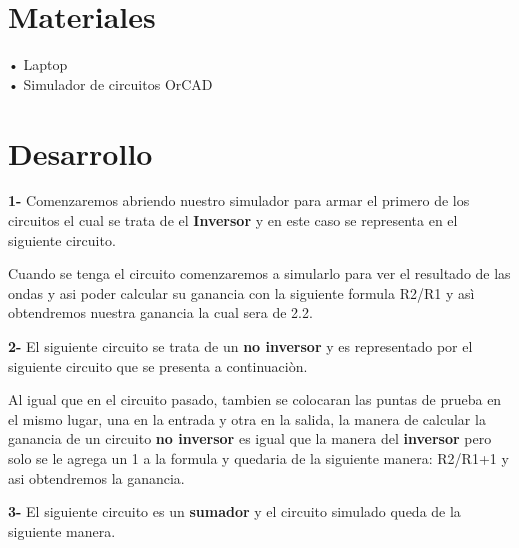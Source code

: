 \documentclass[12pt,a4paper]{article}
\begin{document}
\section{Materiales}
• Laptop\\• Simulador de circuitos OrCAD

\section{Desarrollo}
\textbf{1-} Comenzaremos abriendo nuestro simulador para armar el primero de los circuitos el cual se trata de el \textbf{Inversor} y en este caso se representa en el siguiente circuito.

\begin{figure}
\centering

\end{figure}

Cuando se tenga el circuito comenzaremos a simularlo para ver el resultado de las ondas y asi poder calcular su ganancia con la siguiente formula R2/R1 y asì obtendremos nuestra ganancia la cual sera de 2.2.

\begin{figure}
\centering

\end{figure}

\textbf{2-} El siguiente circuito se trata de un \textbf{no inversor} y es representado por el siguiente circuito que se presenta a continuaciòn.

\begin{figure}
\centering

\end{figure}

Al igual que en el circuito pasado, tambien se colocaran las puntas de prueba en el mismo lugar, una en la entrada y otra en la salida, la manera de calcular la ganancia de un circuito \textbf{no inversor} es igual que la manera del \textbf{inversor} pero solo se le agrega un 1 a la formula y quedaria de la siguiente manera: R2/R1+1 y asi obtendremos la ganancia.

\begin{figure}
\centering

\end{figure}

\textbf{3-} El siguiente circuito es un \textbf{sumador} y el circuito simulado queda de la siguiente manera.

\begin{figure}
\centering

\end{figure}
\end{document}
